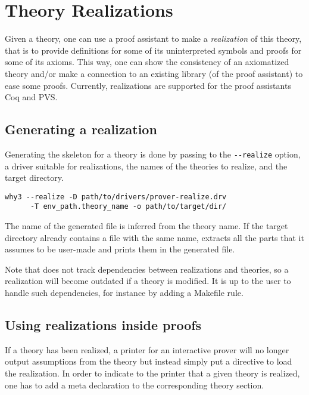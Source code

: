 \chapter{Theory Realizations}
\label{chap:realizations}

Given a \why theory, one can use a proof assistant to make a
\emph{realization} of this theory, that is to provide definitions for
some of its uninterpreted symbols and proofs for some of its
axioms. This way, one can show the consistency of an axiomatized
theory and/or make a connection to an existing library (of the proof
assistant) to ease some proofs.
Currently, realizations are supported for the proof assistants Coq and PVS.

\section{Generating a realization}

Generating the skeleton for a theory is done by passing to \why the
\verb+--realize+ option, a driver suitable for realizations, the names of
the theories to realize, and the target directory.

\begin{verbatim}
why3 --realize -D path/to/drivers/prover-realize.drv
      -T env_path.theory_name -o path/to/target/dir/
\end{verbatim}

The name of the generated file is inferred from the theory name. If the
target directory already contains a file with the same name, \why
extracts all the parts that it assumes to be user-made and prints them in
the generated file.

Note that \why does not track dependencies between realizations and
theories, so a realization will become outdated if a theory is modified.
It is up to the user to handle such dependencies, for instance by adding
a Makefile rule.

\section{Using realizations inside proofs}

If a theory has been realized, a \why printer for an interactive prover
will no longer output assumptions from the theory but instead simply put
a directive to load the realization. In order to indicate to the printer
that a given theory is realized, one has to add a meta declaration to the
corresponding theory section.


